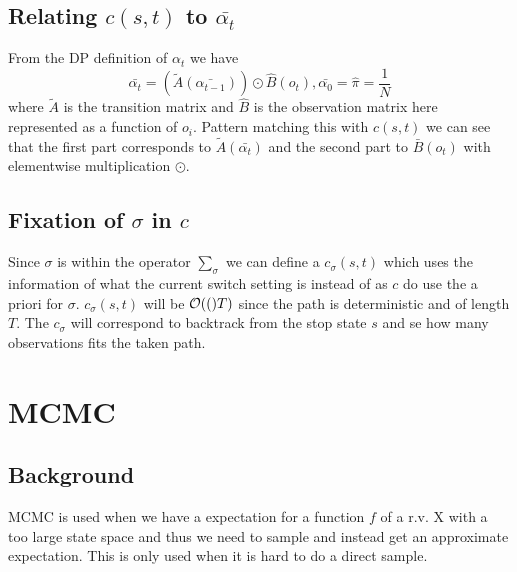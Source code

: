 \documentclass[a4paper,11pt]{kth-mag}
\begin{document}
            \subsection{Relating $c\left(s,t\right)$ to $\bar{\alpha_t}$} 
                From the DP definition of $\alpha_t$ we have
                \begin{equation}
                    \bar{\alpha_{t}} 
                    = (\widetilde{A}(\bar{\alpha_{t-1}}))\odot \hat{B}(o_t)
                    , \bar{\alpha_0}=\hat{\pi}=\frac{1}{N}
                \end{equation}
                where $\widetilde{A}$ is the transition matrix and $\hat{B}$ is the 
                observation matrix here represented as a function of $o_i$.
                Pattern matching this with $c(s,t)$ we can see that the first part corresponds to
                $\widetilde{A}(\bar{\alpha_t})$ and the second part to 
                $\bar{B}(o_t)$ with elementwise multiplication $\odot$.

            \subsection{Fixation of $\sigma$ in $c$}
                Since $\sigma$ is within the operator $\sum\limits_\sigma$ we can define a
                $c_\sigma(s,t)$ which uses the information of what the current 
                switch setting is instead of as $c$ do use the a priori for $\sigma$.
                $c_\sigma(s,t)$ will be $\mathcal{O}{\left((\right)}T)$ since the path is 
                deterministic and of length $T$. The $c_\sigma$ will correspond to backtrack from the stop state $s$ and se how many observations fits the taken path.

        \section{MCMC}
            \subsection{Background}
                MCMC is used when we have a expectation for a function $f$ of a r.v. X with a too large state space 
                and thus we need to sample and instead get an approximate expectation. This is only used when it is hard to do a direct sample.
                
\end{document}
